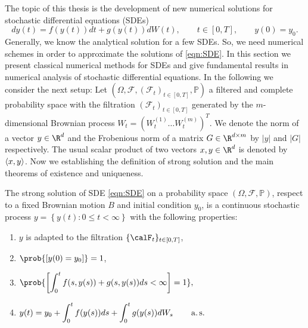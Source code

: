 
	The topic of this thesis is the development of new numerical solutions for stochastic differential equations (SDEs)
\begin{equation}\label{eqn:SDE}
	dy(t) = f(y(t))dt + g(y(t))dW(t), \qquad t\in [0,T], \qquad y(0)=y_0 .
\end{equation}
	Generally, we know the analytical solution for a few SDEs.
So, we need numerical schemes in order to approximate the solutions of \cref{eqn:SDE}. In this section we present  
classical numerical methods for SDEs  and give fundamental results in numerical analysis of stochastic  
differential equations.	 In the following we consider the next setup: Let 
$(\Omega,\mathcal{F},(\mathcal{F}_t)_{t\in[0,T]},\mathbb{P})$  a filtered and complete probability space with
the filtration $(\mathcal{F}_t)_{t\in[0,T]}$ generated by the $m$-dimensional Brownian process 
$W_t=( W_t^{(1)} \ldots W_t^{(m)})^T$. 
We denote  the norm of a vector $y\in \R^d$ and the Frobenious norm 
of a matrix $G\in \R^{d\times m}$  by $|y|$ and $|G|$ respectively. The usual scalar product of two vectors 
$x,y\in \R^d$ is denoted by $\left\langle x, y\right\rangle$. 
Now we establishing the definition of strong solution and the main theorems of  
existence and  uniqueness.

\begin{definition}
	The strong solution of  SDE \eqref{eqn:SDE} on a probability space $(\Omega,\mathcal{F},\mathbb{P})$,
	respect to a fixed Brownian motion $B$ and initial condition $y_0$,
	is a continuous stochastic process $y=\left\{ y(t): 0\leq t<\infty\right\} $
	with the following properties:
	\begin{enumerate}[(SS-1)]
		\item \label{eq:SF1}
			$y$ is adapted to the filtration $\{\calF_{t}\}_{t\in[0,T]}$,
		\item \label{eq:SF2}
			$\prob{[y(0)=y_0]}=1$,
		\item \label{eq:SF3}
		$\displaystyle \prob{\left[\int_{0}^{t}f(s,y(s))+g(s,y(s))ds<\infty\right]=1},$
		\item \label{eq:SF4}
		$
		\displaystyle
			y(t)=y_0+\int_{0}^{t} f(y(s))ds+
		\int_{0}^{t} g(y(s))dW_s
		\qquad \operatorname*{a.s.}
		$
	\end{enumerate}
\end{definition}
	
